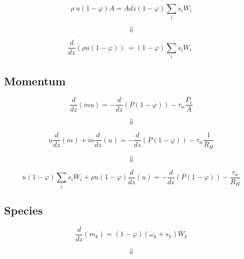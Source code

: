 \begin{equation*}
	\rho\ u(1-\varphi)A=Adz(1-\varphi)\sum_{i}{{\dot{s}}_iW_i}
\end{equation*}

\begin{equation*}
	\Downarrow
\end{equation*}

\begin{equation}
	\frac{d}{dz}\left(\rho u(1-\varphi)\right)\ =(1-\varphi)\sum_{i}{{\dot{s}}_iW_i}\ \ 
	\label{eqn:app_contpfr}
\end{equation}

\subsection{Momentum}

\begin{equation*}
	\frac{d}{dz}(\dot{m}u) = -\frac{d}{dz}(P(1-\varphi))
	-\tau_w \frac{P_c}{A}
\end{equation*}

\begin{equation*}
	\Downarrow
\end{equation*}

\begin{equation*}
	u\frac{d}{dz}(\dot{m}) + \dot{m}\frac{d}{dz}(u)= -\frac{d}{dz}(P(1-\varphi))
	-\tau_w \frac{1}{R_H}
\end{equation*}

\begin{equation*}
	\Downarrow
\end{equation*}

\begin{equation}
	u(1-\varphi)\sum_{i}{{\dot{s}}_iW_i} + \rho u(1-\varphi)\frac{d}{dz}(u)= -\frac{d}{dz}(P(1-\varphi))
	-\frac{\tau_w}{R_H}
\end{equation}

\subsection{Species}

\begin{equation*}
	\frac{d}{dz}\left(m_k\right)=\left(1-\varphi\right)\left({\dot{\omega}}_k+{\dot{s}}_k\right)W_k
\end{equation*}

\begin{equation*}
	\Downarrow
\end{equation*}


